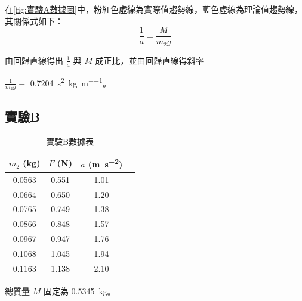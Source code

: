 \documentclass[11pt,a4paper]{article}
\theoremstyle{definition}
\begin{document}
            在\autoref{fig:實驗A數據圖}中，粉紅色虛線為實際值趨勢線，藍色虛線為理論值趨勢線，其關係式如下：
            \begin{equation}
                \frac{1}{a} = \frac{M}{m_2 g} \label{eq:theory_A}
            \end{equation}

            \par 由回歸直線得出
            $\displaystyle\frac{1}{a}$ 與 $M$ 成正比，並由回歸直線得斜率 
            \par$\displaystyle{\frac{1}{m_2 g}} = $ \SI{0.7204}{\second\squared\per\kilogram\per\meter}。

        \subsection{實驗B}

            \begin{table}[H]
                \centering
                \caption{實驗B數據表}
                \label{tab:expB_data}
                \begin{tabular}{|c|c|c|c|}
                    \hline
                    $m_2$ (\si{\kilogram}) &  $F$ (\si{\newton}) & $a$ (\si{\meter\per\second\squared}) \\
                    \hline
                    0.0563 & 0.551 & 1.01 \\ \hline
                    0.0664 & 0.650 & 1.20 \\ \hline
                    0.0765 & 0.749 & 1.38 \\ \hline
                    0.0866 & 0.848 & 1.57 \\ \hline
                    0.0967 & 0.947 & 1.76 \\ \hline
                    0.1068 & 1.045 & 1.94 \\ \hline
                    0.1163 & 1.138 & 2.10 \\ \hline
                \end{tabular}
            \end{table}
            總質量 $M$ 固定為 \SI{0.5345}{\kilogram}。
\end{document}
